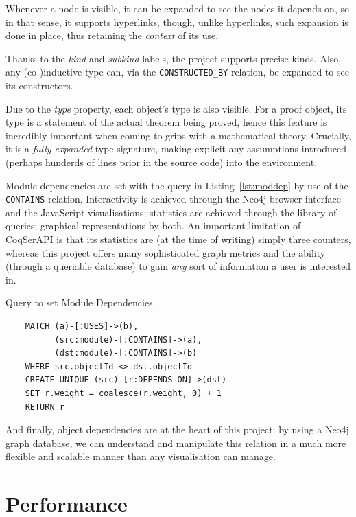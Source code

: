 Whenever a node is visible, it can be expanded to see the nodes it depends on,
so in that sense, it supports hyperlinks, though, unlike hyperlinks, such
expansion is done in place, thus retaining the \emph{context} of its use.

Thanks to the \emph{kind} and \emph{subkind} labels, the project supports
precise kinds.  Also, any (co-)inductive type can, via the
\texttt{CONSTRUCTED\_BY} relation, be expanded to see its constructors.

Due to the \emph{type} property, each object's type is also visible. For a proof
object, its type is a statement of the actual theorem being proved, hence this
feature is incredibly important when coming to grips with a mathematical theory.
Crucially, it is a \emph{fully expanded} type signature, making explicit any
assumptions introduced (perhaps hunderds of lines prior in the source code) into
the environment.

Module dependencies are set with the query in Listing~\ref{lst:moddep} by use of
the \texttt{CONTAINS} relation.  Interactivity is achieved through the Neo4j
browser interface and the JavaScript visualisations; statistics are achieved
through the library of queries; graphical representations by both. An important
limitation of CoqSerAPI is that its statistics are (at the time of writing)
simply three counters, whereas this project offers many sophisticated graph
metrics and the ability (through a queriable database) to gain \emph{any} sort
of information a user is interested in.

\begin{listing}[p]%

\caption{Query to set Module Dependencies}\label{lst:moddep}

  \begin{verbatim}
    MATCH (a)-[:USES]->(b),
          (src:module)-[:CONTAINS]->(a),
          (dst:module)-[:CONTAINS]->(b)
    WHERE src.objectId <> dst.objectId
    CREATE UNIQUE (src)-[r:DEPENDS_ON]->(dst)
    SET r.weight = coalesce(r.weight, 0) + 1
    RETURN r
  \end{verbatim}

\end{listing}

And finally, object dependencies are at the heart of this project: by using a
Neo4j graph database, we can understand and manipulate this relation in a much
more flexible and scalable manner than any visualisation can manage.

\section{Performance}

